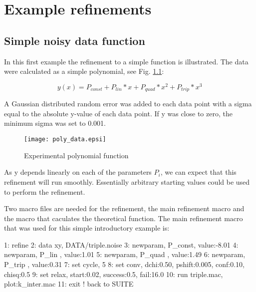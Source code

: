 
\chapter{Example refinements \label{exa}}
\section{Simple noisy data function \label{exa-simple}}

In this first example the refinement to a simple function is
illustrated. The data were calculated as a simple polynomial,
see Fig. \ref{fexa-poly-exp}:

\begin{equation}
  y(x) = P_{const} + P_{lin}*x + P_{quad}*x^2 + P_{trip}*x^3
\end{equation}

A Gaussian distributed random error was added to each data point 
with a sigma equal to the absolute y-value of each data point.
If y was close to zero, the minimum sigma was set to 0.001.

\begin{figure}
   \texttt{[image: poly\_data.epsi]}
   \caption{Experimental polynomial function}
   \label{fexa-poly-exp}
\end{figure}

As y depends linearly on each of the parameters $P_{i}$, we can expect
that this refinement will run smoothly. Essentially arbitrary starting values
could be used to perform the refinement.

Two macro files are needed for the refinement, the main refinement macro and the
macro that caculates the theoretical function. The main refinement macro that
was used for this simple introductory example is:

\begin{MacVerbatim}
 1: refine
 2: data xy, DATA/triple.noise
 3: newparam, P_const, value:-8.01
 4: newparam, P_lin  , value:1.01
 5: newparam, P_quad , value:1.49
 6: newparam, P_trip , value:0.31
 7: set  cycle,   5
 8: set conv, dchi:0.50, pshift:0.005, conf:0.10, chisq:0.5
 9: set relax, start:0.02, success:0.5, fail:16.0
10: run triple.mac, plot:k_inter.mac
11: exit   ! back to SUITE
\end{MacVerbatim}

